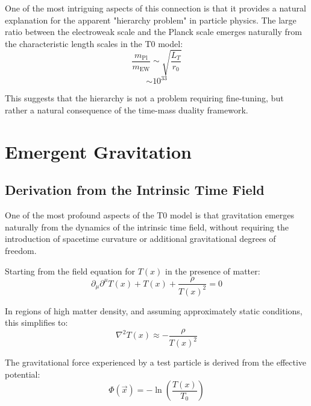 \documentclass[12pt,a4paper]{article} %
\newcommand{\Tfield}{T(x)}
\newcommand{\Tzero}{T_0}
\newcommand{\vecx}{\vec{x}}
\begin{document}
	One of the most intriguing aspects of this connection
	is that it provides a natural explanation for the apparent "hierarchy problem"
	in particle physics. 
	The large ratio between the electroweak scale and the Planck scale
	emerges naturally from the characteristic length scales in the T0 model:
	\begin{equation}
		\frac{m_{\text{Pl}}}{m_{\text{EW}}} \sim \sqrt{\frac{L_T}{r_0}}
		\label{eq:hierarchy_relation_part1}
	\end{equation}
	\begin{equation}
		\sim 10^{33}
		\label{eq:hierarchy_relation_part2}
	\end{equation}
	
	This suggests that the hierarchy is not a problem requiring fine-tuning,
	but rather a natural consequence of the time-mass duality framework.
	
	\section{Emergent Gravitation}
	\label{sec:emergent_grav}
	
	\subsection{Derivation from the Intrinsic Time Field}
	\label{subsec:grav_derivation}
	
	One of the most profound aspects of the T0 model
	is that gravitation emerges naturally from the dynamics of the intrinsic time field,
	without requiring the introduction of spacetime curvature
	or additional gravitational degrees of freedom.
	
	Starting from the field equation for $\Tfield$ in the presence of matter:
	\begin{equation}
		\partial_{\mu}\partial^{\mu}\Tfield + \Tfield + \frac{\rho}{\Tfield^2} = 0
		\label{eq:field_eq_matter}
	\end{equation}
	
	In regions of high matter density,
	and assuming approximately static conditions,
	this simplifies to:
	\begin{equation}
		\nabla^2\Tfield \approx -\frac{\rho}{\Tfield^2}
		\label{eq:static_field_eq}
	\end{equation}
	
	The gravitational force experienced by a test particle
	is derived from the effective potential:
	\begin{equation}
		\Phi(\vecx) = -\ln\left(\frac{\Tfield}{\Tzero}\right)
		\label{eq:grav_potential_def}
	\end{equation}
	
\end{document}
